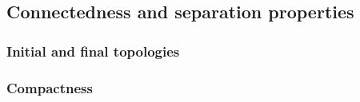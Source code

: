 \documentclass{article}
\begin{document}
\subsection{Connectedness and separation properties}

\begin{definition}[Conectedness]
\end{definition}

\begin{example}
\end{example}

\begin{proposition}
\end{proposition}

\begin{definition}
\end{definition}

\begin{proposition}
\end{proposition}

\begin{example}
\end{example}

\begin{definition}
\end{definition}

\begin{example}
\end{example}

\begin{definition}
\end{definition}

\subsubsection{Initial and final topologies}

\begin{definition}
\end{definition}

\begin{definition}
\end{definition}

\subsubsection{Compactness}
\end{document}

